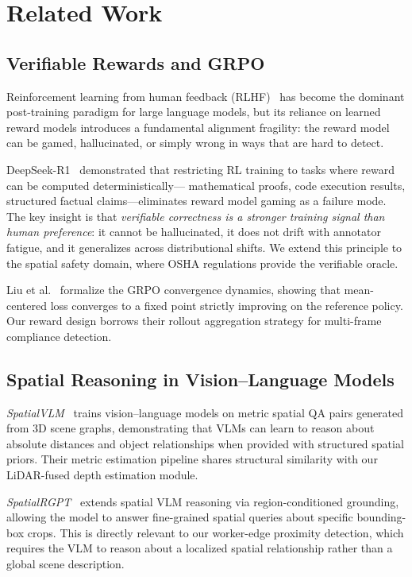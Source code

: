 \documentclass[sigconf,nonacm]{acmart}
\begin{document}
\section{Related Work}
\label{sec:related}

\subsection{Verifiable Rewards and GRPO}

Reinforcement learning from human feedback (RLHF)~\cite{christiano2017deep}
has become the dominant post-training paradigm for large language models,
but its reliance on learned reward models introduces a fundamental
alignment fragility: the reward model can be gamed, hallucinated, or
simply wrong in ways that are hard to detect.

DeepSeek-R1~\cite{guo2025deepseekr1} demonstrated that restricting
RL training to tasks where reward can be computed deterministically---
mathematical proofs, code execution results, structured factual
claims---eliminates reward model gaming as a failure mode.
The key insight is that \emph{verifiable correctness is a stronger
training signal than human preference}: it cannot be hallucinated, it does
not drift with annotator fatigue, and it generalizes across distributional
shifts.
We extend this principle to the spatial safety domain, where OSHA
regulations provide the verifiable oracle.

Liu et al.~\cite{liu2025grpo} formalize the GRPO convergence dynamics,
showing that mean-centered loss converges to a fixed point strictly
improving on the reference policy.
Our reward design borrows their rollout aggregation strategy for multi-frame
compliance detection.

\subsection{Spatial Reasoning in Vision--Language Models}

\emph{SpatialVLM}~\cite{spatialvlm2024} trains vision--language models on
metric spatial QA pairs generated from 3D scene graphs, demonstrating that
VLMs can learn to reason about absolute distances and object relationships
when provided with structured spatial priors.
Their metric estimation pipeline shares structural similarity with our
LiDAR-fused depth estimation module.

\emph{SpatialRGPT}~\cite{spatialrgpt2024} extends spatial VLM reasoning via
region-conditioned grounding, allowing the model to answer fine-grained
spatial queries about specific bounding-box crops.
This is directly relevant to our worker-edge proximity detection, which
requires the VLM to reason about a localized spatial relationship rather
than a global scene description.
\end{document}
